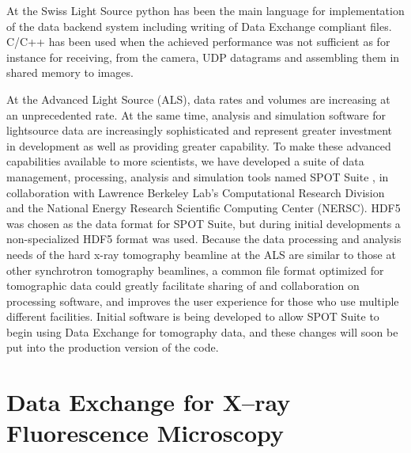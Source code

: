 \documentclass[pdf]{iucr}              %
\begin{document}
At the Swiss Light Source python has been the main language for implementation of the data backend system including writing of Data Exchange compliant files. C/C++ has been used when the achieved performance was not sufficient as for instance for receiving, from the camera, UDP datagrams and assembling them in shared memory to images.

At the Advanced Light Source (ALS), data rates and volumes are increasing at an unprecedented rate. At the same time, analysis and simulation software for lightsource data are increasingly sophisticated and represent greater investment in development as well as providing greater capability. To make these advanced capabilities available to more scientists, we have developed a suite of data management, processing, analysis and simulation tools named SPOT Suite \cite{Spote_suite}, in collaboration with Lawrence Berkeley Lab's Computational Research Division and the National Energy Research Scientific Computing Center (NERSC). HDF5 was chosen as the data format for SPOT Suite, but during initial developments a non-specialized HDF5 format was used. Because the data processing and analysis needs of the hard x-ray tomography beamline at the ALS are similar to those at other synchrotron tomography beamlines, a common file format optimized for tomographic data could greatly facilitate sharing of and collaboration on processing software, and improves the user experience for those who use multiple different facilities. Initial software is being developed to allow SPOT Suite to begin using Data Exchange for tomography data, and these changes will soon be put into the production version of the code.

\section{Data Exchange for X--ray Fluorescence Microscopy}
\end{document}

